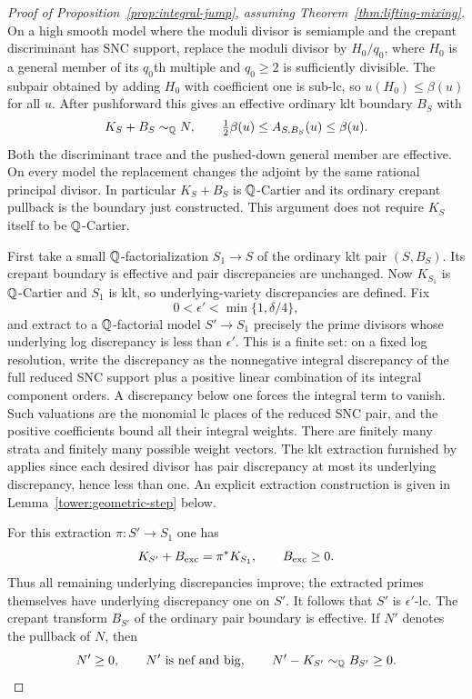 \begin{proof}[Proof of Proposition~\ref{prop:integral-jump}, assuming
Theorem~\ref{thm:lifting-mixing}]
On a high smooth model where the moduli divisor is semiample and
the crepant discriminant has SNC support, replace the moduli
divisor by $H_0/q_0$, where $H_0$ is a general member of its
$q_0$th multiple and $q_0\ge2$ is sufficiently divisible.
The subpair obtained by adding $H_0$ with coefficient one is
sub-lc, so $u(H_0)\le\beta(u)$ for all $u$.
After pushforward this gives an effective ordinary klt boundary
$B_S$ with
\begin{equation}
\label{ij:ordinary-base}
 K_S+B_S\sim_{\mathbb Q}N,
 \qquad \tfrac12\beta(u)\le A_{S,B_S}(u)\le\beta(u).
\end{equation}
Both the discriminant trace and the pushed-down general member
are effective.  On every model the replacement changes the adjoint
by the same rational principal divisor.  In particular
$K_S+B_S$ is $\mathbb Q$-Cartier and its ordinary crepant pullback is the
boundary just constructed.  This argument does not require
$K_S$ itself to be $\mathbb Q$-Cartier.

First take a small $\mathbb Q$-factorialization
$S_1\to S$ of the ordinary klt pair $(S,B_S)$.
Its crepant boundary is effective and pair discrepancies are
unchanged.  Now $K_{S_1}$ is $\mathbb Q$-Cartier and $S_1$ is klt, so
underlying-variety discrepancies are defined.  Fix
\[
 0<\epsilon'<\min\{1,\delta/4\},
\]
and extract to a $\mathbb Q$-factorial model $S'\to S_1$ precisely the
prime divisors whose underlying log discrepancy is less than
$\epsilon'$.  This is a finite set: on a fixed log resolution,
write the discrepancy as the nonnegative integral discrepancy of
the full reduced SNC support plus a positive linear combination
of its integral component orders.  A discrepancy below one forces
the integral term to vanish.  Such valuations are the monomial
lc places of the reduced SNC pair, and the positive coefficients
bound all their integral weights.  There are finitely many strata
and finitely many possible weight vectors.
The klt extraction furnished by \cite{BCHM} applies since each
desired divisor has pair discrepancy at most its underlying
discrepancy, hence less than one.  An explicit extraction
construction is given in Lemma~\ref{tower:geometric-step} below.

For this extraction $\pi:S'\to S_1$ one has
\[
 K_{S'}+B_{\rm exc}=\pi^*K_{S_1},\qquad B_{\rm exc}\ge0.
\]
Thus all remaining underlying discrepancies improve; the extracted
primes themselves have underlying discrepancy one on $S'$.
It follows that $S'$ is $\epsilon'$-lc.
The crepant transform $B_{S'}$ of the ordinary pair boundary is
effective.  If $N'$ denotes the pullback of $N$, then
\begin{equation}
\label{ij:birkar-hypotheses}
 N'\ge0,\qquad N'\text{ is nef and big},\qquad
 N'-K_{S'}\sim_{\mathbb Q}B_{S'}\ge0.
\end{equation}


\end{proof}
